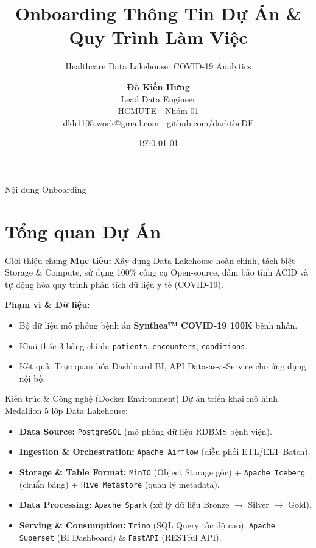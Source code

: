 \documentclass[10pt, aspectratio=169]{beamer}
\title[Healthcare Data Lakehouse]{Onboarding Thông Tin Dự Án \& Quy Trình Làm Việc}
\subtitle{Healthcare Data Lakehouse: COVID-19 Analytics}
\author[Đỗ Kiến Hưng]{
    \textbf{Đỗ Kiến Hưng} \\
    Lead Data Engineer \\
    \footnotesize HCMUTE - Nhóm 01 \\
    \href{mailto:dkh1105.work@gmail.com}{dkh1105.work@gmail.com} $|$ \href{https://github.com/darktheDE}{github.com/darktheDE}
}
\institute[HCMUTE]{Đại học Sư phạm Kỹ thuật TP.HCM}
\date{\today}
\begin{document}
\begin{frame}
    \titlepage
\end{frame}

\begin{frame}{Nội dung Onboarding}
    \tableofcontents
\end{frame}

\section{Tổng quan Dự Án}

\begin{frame}{Giới thiệu chung}
    \textbf{Mục tiêu:} 
    Xây dựng Data Lakehouse hoàn chỉnh, tách biệt Storage \& Compute, sử dụng 100\% công cụ Open-source, đảm bảo tính ACID và tự động hóa quy trình phân tích dữ liệu y tế (COVID-19).
    
    \vspace{0.3cm}
    \textbf{Phạm vi \& Dữ liệu:}
    \begin{itemize}
        \item Bộ dữ liệu mô phỏng bệnh án \textbf{Synthea™ COVID-19 100K} bệnh nhân.
        \item Khai thác 3 bảng chính: \texttt{patients}, \texttt{encounters}, \texttt{conditions}.
        \item Kết quả: Trực quan hóa Dashboard BI, API Data-as-a-Service cho ứng dụng nội bộ.
    \end{itemize}
\end{frame}

\begin{frame}{Kiến trúc \& Công nghệ (Docker Environment)}
    Dự án triển khai mô hình Medallion 5 lớp Data Lakehouse:
    \begin{itemize}
        \item \textbf{Data Source:} \texttt{PostgreSQL} (mô phỏng dữ liệu RDBMS bệnh viện).
        \item \textbf{Ingestion \& Orchestration:} \texttt{Apache Airflow} (điều phối ETL/ELT Batch).
        \item \textbf{Storage \& Table Format:} \texttt{MinIO} (Object Storage gốc) + \texttt{Apache Iceberg} (chuẩn bảng) + \texttt{Hive Metastore} (quản lý metadata).
        \item \textbf{Data Processing:} \texttt{Apache Spark} (xử lý dữ liệu Bronze $\rightarrow$ Silver $\rightarrow$ Gold).
        \item \textbf{Serving \& Consumption:} \texttt{Trino} (SQL Query tốc độ cao), \texttt{Apache Superset} (BI Dashboard) \& \texttt{FastAPI} (RESTful API).
    \end{itemize}
\end{frame}
\end{document}
